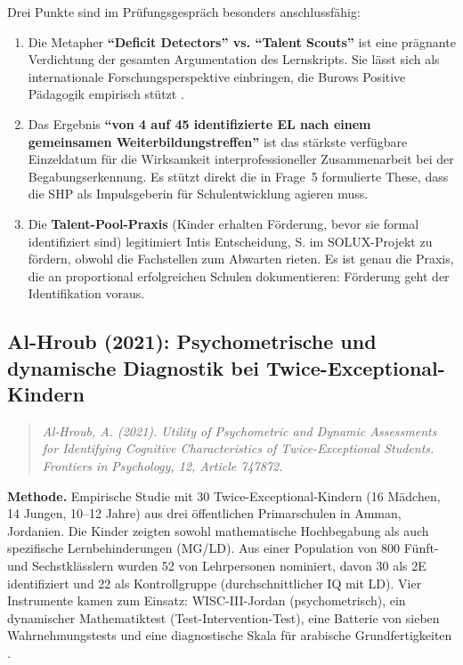 \documentclass[ngerman, a4paper]{article}
\begin{document}
Drei Punkte sind im Prüfungsgespräch besonders anschlussfähig:

\begin{enumerate}
  \item Die Metapher \textbf{\enquote{Deficit Detectors} vs.
    \enquote{Talent Scouts}} ist eine prägnante Verdichtung der gesamten
    Argumentation des Lernskripts. Sie lässt sich als internationale
    Forschungsperspektive einbringen, die Burows Positive Pädagogik
    empirisch stützt \parencite{burow2021positive}.
  \item Das Ergebnis \textbf{\enquote{von 4 auf 45 identifizierte EL nach
    einem gemeinsamen Weiterbildungstreffen}} ist das stärkste verfügbare
    Einzeldatum für die Wirksamkeit interprofessioneller Zusammenarbeit
    bei der Begabungserkennung. Es stützt direkt die in Frage~5
    formulierte These, dass die SHP als Impulsgeberin für
    Schulentwicklung agieren muss.
  \item Die \textbf{Talent-Pool-Praxis} (Kinder erhalten Förderung, bevor
    sie formal identifiziert sind) legitimiert Intis Entscheidung, S. im
    SOLUX-Projekt zu fördern, obwohl die Fachstellen zum Abwarten rieten.
    Es ist genau die Praxis, die \textcite{gubbins2020promising} an
    proportional erfolgreichen Schulen dokumentieren: Förderung geht der
    Identifikation voraus.
\end{enumerate}


\subsection*{Al-Hroub (2021): Psychometrische und dynamische Diagnostik
  bei Twice-Exceptional-Kindern}
\label{subsec:alhroub2021}

\begin{quote}\itshape
Al-Hroub, A. (2021). Utility of Psychometric and Dynamic Assessments for
Identifying Cognitive Characteristics of Twice-Exceptional Students.
\upshape Frontiers in Psychology, 12, Article 747872.
\end{quote}

\textbf{Methode.} Empirische Studie mit 30 Twice-Exceptional-Kindern (16
Mädchen, 14 Jungen, 10--12 Jahre) aus drei öffentlichen Primarschulen in
Amman, Jordanien. Die Kinder zeigten sowohl mathematische Hochbegabung als
auch spezifische Lernbehinderungen (MG/LD). Aus einer Population von 800
Fünft- und Sechstklässlern wurden 52 von Lehrpersonen nominiert, davon 30
als 2E identifiziert und 22 als Kontrollgruppe (durchschnittlicher IQ mit
LD). Vier Instrumente kamen zum Einsatz: WISC-III-Jordan
(psychometrisch), ein dynamischer Mathematiktest
(Test-Intervention-Test), eine Batterie von sieben Wahrnehmungstests und
eine diagnostische Skala für arabische Grundfertigkeiten
\parencite{alhroub2021utility}.
\end{document}
